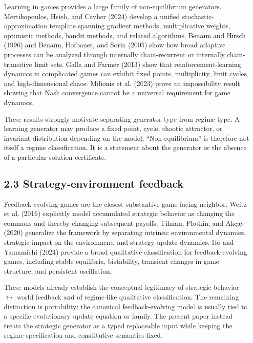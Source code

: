 \documentclass[10pt]{article}
\begin{document}
Learning in games provides a large family of non-equilibrium generators.
Mertikopoulos, Hsieh, and Cevher (2024) develop a unified
stochastic-approximation template spanning gradient methods,
multiplicative weights, optimistic methods, bandit methods, and related
algorithms. Benaïm and Hirsch (1996) and Benaïm, Hofbauer, and Sorin
(2005) show how broad adaptive processes can be analyzed through
internally chain-recurrent or internally chain-transitive limit sets.
Galla and Farmer (2013) show that reinforcement-learning dynamics in
complicated games can exhibit fixed points, multiplicity, limit cycles,
and high-dimensional chaos. Milionis et al. (2023) prove an
impossibility result showing that Nash convergence cannot be a universal
requirement for game dynamics.

These results strongly motivate separating generator type from regime
type. A learning generator may produce a fixed point, cycle, chaotic
attractor, or invariant distribution depending on the model.
``Non-equilibrium'' is therefore not itself a regime classification. It
is a statement about the generator or the absence of a particular
solution certificate.

\subsection{2.3 Strategy-environment
feedback}\label{strategy-environment-feedback}

Feedback-evolving games are the closest substantive game-facing
neighbor. Weitz et al. (2016) explicitly model accumulated strategic
behavior as changing the commons and thereby changing subsequent
payoffs. Tilman, Plotkin, and Akçay (2020) generalize the framework by
separating intrinsic environmental dynamics, strategic impact on the
environment, and strategy-update dynamics. Ito and Yamamichi (2024)
provide a broad qualitative classification for feedback-evolving games,
including stable equilibria, bistability, transient changes in game
structure, and persistent oscillation.

These models already establish the conceptual legitimacy of strategic
behavior \(\leftrightarrow\) world feedback and of regime-like
qualitative classification. The remaining distinction is portability:
the canonical feedback-evolving model is usually tied to a specific
evolutionary update equation or family. The present paper instead treats
the strategic generator as a typed replaceable input while keeping the
regime specification and constitutive semantics fixed.
\end{document}
